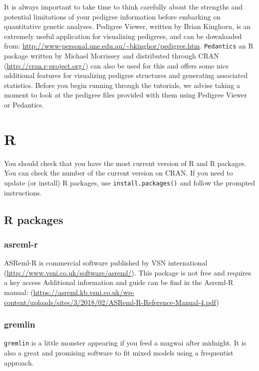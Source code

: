 \documentclass[
  12pt,
]{book}
\begin{document}
It is always important to take time to think carefully about the strengths and potential limitations of your pedigree information before embarking on quantitative genetic analyses. Pedigree Viewer, written by Brian Kinghorn, is an extremely useful application for visualizing pedigrees, and can be downloaded from: \url{http://www-personal.une.edu.au/~bkinghor/pedigree.htm}. \texttt{Pedantics} an R package written by Michael Morrissey and distributed through CRAN (\url{http://cran.r-project.org/}) can also be used for this and offers some nice additional features for visualizing pedigree structures and generating associated statistics. Before you begin running through the tutorials, we advise taking a moment to look at the pedigree files provided with them using Pedigree Viewer or Pedantics.

\hypertarget{r}{%
\section{R}\label{r}}

You should check that you have the most current version of R and R packages. You can check the number of the current version on CRAN. If you need to update (or install) R packages, use \texttt{install.packages()} and follow the prompted instructions.

\hypertarget{r-packages}{%
\subsection{R packages}\label{r-packages}}

\hypertarget{asreml-r}{%
\subsubsection{asreml-r}\label{asreml-r}}

ASReml-R is commercial software published by VSN international (\url{http://www.vsni.co.uk/software/asreml/}). This package is not free and requires a key access
Additional information and guide can be find in the Asreml-R manual: (\url{https://asreml.kb.vsni.co.uk/wp-content/uploads/sites/3/2018/02/ASReml-R-Reference-Manual-4.pdf})

\hypertarget{gremlin}{%
\subsubsection{gremlin}\label{gremlin}}

\texttt{gremlin} is a little monster appearing if you feed a mugwai after midnight. It is also a great and promising software to fit mixed models using a frequentist approach.
\end{document}
